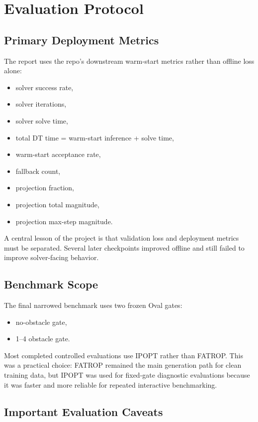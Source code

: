 \section{Evaluation Protocol}

\subsection{Primary Deployment Metrics}

The report uses the repo's downstream warm-start metrics rather than offline loss alone:
\begin{itemize}
\item solver success rate,
\item solver iterations,
\item solver solve time,
\item total DT time = warm-start inference + solve time,
\item warm-start acceptance rate,
\item fallback count,
\item projection fraction,
\item projection total magnitude,
\item projection max-step magnitude.
\end{itemize}

A central lesson of the project is that validation loss and deployment metrics must be separated. Several later checkpoints improved offline and still failed to improve solver-facing behavior.

\subsection{Benchmark Scope}

The final narrowed benchmark uses two frozen Oval gates:
\begin{itemize}
\item no-obstacle gate,
\item 1--4 obstacle gate.
\end{itemize}

Most completed controlled evaluations use IPOPT rather than FATROP. This was a practical choice: FATROP remained the main generation path for clean training data, but IPOPT was used for fixed-gate diagnostic evaluations because it was faster and more reliable for repeated interactive benchmarking.

\subsection{Important Evaluation Caveats}

